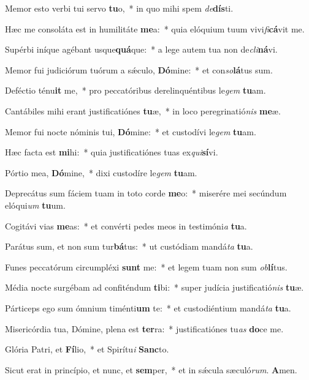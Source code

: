 \item Memor esto verbi tui servo \textbf{tu}o,~* in quo mihi spem \emph{de}\textbf{dís}ti.
\item Hæc me consoláta est in humilitáte \textbf{me}a:~* quia elóquium tuum vivi\emph{fi}\textbf{cá}vit me.
\item Supérbi iníque agébant usque\textbf{quá}que:~* a lege autem tua non de\emph{cli}\textbf{ná}vi.
\item Memor fui judiciórum tuórum a sǽculo, \textbf{Dó}mine:~* et con\emph{so}\textbf{lá}tus sum.
\item Deféctio ténu\textbf{it} me,~* pro peccatóribus derelinquéntibus le\emph{gem} \textbf{tu}am.
\item Cantábiles mihi erant justificatiónes \textbf{tu}æ,~* in loco peregrinatió\emph{nis} \textbf{me}æ.
\item Memor fui nocte nóminis tui, \textbf{Dó}mine:~* et custodívi le\emph{gem} \textbf{tu}am.
\item Hæc facta est \textbf{mi}hi:~* quia justificatiónes tuas ex\emph{qui}\textbf{sí}vi.
\item Pórtio mea, \textbf{Dó}mine,~* dixi custodíre le\emph{gem} \textbf{tu}am.
\item Deprecátus sum fáciem tuam in toto corde \textbf{me}o:~* miserére mei secúndum elóqui\emph{um} \textbf{tu}um.
\item Cogitávi vias \textbf{me}as:~* et convérti pedes meos in testimóni\emph{a} \textbf{tu}a.
\item Parátus sum, et non sum tur\textbf{bá}tus:~* ut custódiam mandá\emph{ta} \textbf{tu}a.
\item Funes peccatórum circumpléxi \textbf{sunt} me:~* et legem tuam non sum \emph{ob}\textbf{lí}tus.
\item Média nocte surgébam ad confiténdum \textbf{ti}bi:~* super judícia justificatió\emph{nis} \textbf{tu}æ.
\item Párticeps ego sum ómnium timénti\textbf{um} te:~* et custodiéntium mandá\emph{ta} \textbf{tu}a.
\item Misericórdia tua, Dómine, plena est \textbf{ter}ra:~* justificatiónes tu\emph{as} \textbf{do}ce me.
\item Glória Patri, et \textbf{Fí}lio,~* et Spirítu\emph{i} \textbf{Sanc}to.
\item Sicut erat in princípio, et nunc, et \textbf{sem}per,~* et in sǽcula sæculó\emph{rum}. \textbf{A}men.
